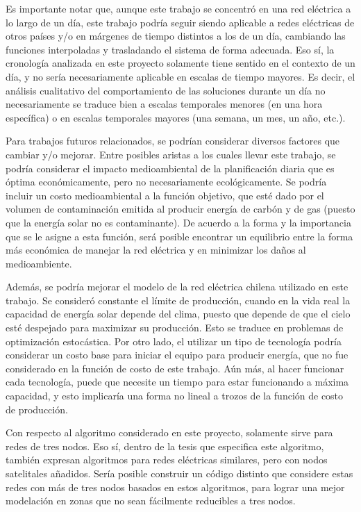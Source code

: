 \documentclass[12pt,twoside]{article}
\begin{document}
	\hspace{1cm} Es importante notar que, aunque este trabajo se concentr\'o en una red el\'ectrica a lo largo de un d\'ia, este trabajo podr\'ia seguir siendo aplicable a redes el\'ectricas de otros pa\'ises y/o en m\'argenes de tiempo distintos a los de un d\'ia, cambiando las funciones interpoladas y trasladando el sistema de forma adecuada. Eso s\'i, la cronolog\'ia analizada en este proyecto solamente tiene sentido en el contexto de un d\'ia, y no ser\'ia necesariamente aplicable en escalas de tiempo mayores. Es decir, el an\'alisis cualitativo del comportamiento de las soluciones durante un d\'ia no necesariamente se traduce bien a escalas temporales menores (en una hora espec\'ifica) o en escalas temporales mayores (una semana, un mes, un a\~{n}o, etc.).
	
	\hspace{1cm} Para trabajos futuros relacionados, se podr\'ian considerar diversos factores que cambiar y/o mejorar. Entre posibles aristas a los cuales llevar este trabajo, se podr\'ia considerar el impacto medioambiental de la planificaci\'on diaria que es \'optima econ\'omicamente, pero no necesariamente ecol\'ogicamente. Se podr\'ia incluir un costo medioambiental a la funci\'on objetivo, que est\'e dado por el volumen de contaminaci\'on emitida al producir energ\'ia de carb\'on y de gas (puesto que la energ\'ia solar no es contaminante). De acuerdo a la forma y la importancia que se le asigne a esta funci\'on, ser\'a posible encontrar un equilibrio entre la forma m\'as econ\'omica de manejar la red el\'ectrica y en minimizar los da\~{n}os al medioambiente.
	
	\hspace{1cm} Adem\'as, se podr\'ia mejorar el modelo de la red el\'ectrica chilena utilizado en este trabajo. Se consider\'o constante el l\'imite de producci\'on, cuando en la vida real la capacidad de energ\'ia solar depende del clima, puesto que depende de que el cielo est\'e despejado para maximizar su producci\'on. Esto se traduce en problemas de optimizaci\'on estoc\'astica. Por otro lado, el utilizar un tipo de tecnolog\'ia podr\'ia considerar un costo base para iniciar el equipo para producir energ\'ia, que no fue considerado en la funci\'on de costo de este trabajo. A\'un m\'as, al hacer funcionar cada tecnolog\'ia, puede que necesite un tiempo para estar funcionando a m\'axima capacidad, y esto implicar\'ia una forma no lineal a trozos de la funci\'on de costo de producci\'on.
	
	\hspace{1cm} Con respecto al algoritmo considerado en este proyecto, solamente sirve para redes de tres nodos. Eso s\'i, dentro de la tesis que especifica este algoritmo, tambi\'en expresan algoritmos para redes el\'ectricas similares, pero con nodos satelitales a\~{n}adidos. Ser\'ia posible construir un c\'odigo distinto que considere estas redes con m\'as de tres nodos basados en estos algoritmos, para lograr una mejor modelaci\'on en zonas que no sean f\'acilmente reducibles a tres nodos.
	
\end{document}
